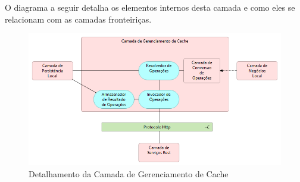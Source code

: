 \documentclass[
	article,			%
	11pt,				%
	oneside,			%
	a4paper,			%
	english,			%
	brazil,				%
	sumario=tradicional
]{abntex2}
\begin{document}
O diagrama a seguir detalha os elementos internos desta camada e como eles se relacionam com as camadas fronteiriças.

\begin{figure}[H]
	\centering
	\includegraphics[scale=0.5]{images/CamadasNivel1}
	\caption{Detalhamento da Camada de Gerenciamento de Cache}
\end{figure}
 
\end{document}

